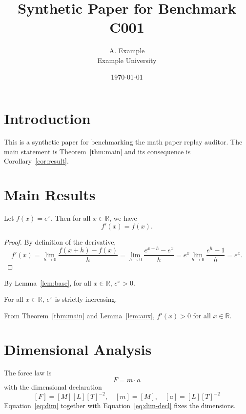 \documentclass{article}
\title{Synthetic Paper for Benchmark C001}
\author{A. Example \\ Example University}
\date{\today}
\begin{document}
\maketitle

\section{Introduction}
This is a synthetic paper for benchmarking the math paper replay auditor.
The main statement is Theorem~\ref{thm:main} and its consequence is
Corollary~\ref{cor:result}.

\section{Main Results}
\begin{theorem}
\label{thm:main}
Let $f(x) = e^x$. Then for all $x \in \mathbb{R}$, we have
\begin{equation}
\label{eq:main}
f'(x) = f(x).
\end{equation}
\end{theorem}

\begin{proof}
By definition of the derivative,
\begin{equation}
\label{eq:deriv}
f'(x) = \lim_{h \to 0} \frac{f(x+h) - f(x)}{h} = \lim_{h \to 0} \frac{e^{x+h} - e^x}{h} = e^x \lim_{h \to 0} \frac{e^h - 1}{h} = e^x.
\end{equation}
\end{proof}

\begin{lemma}
\label{lem:aux}
By Lemma~\ref{lem:base}, for all $x \in \mathbb{R}$, $e^x > 0$.
\end{lemma}

\begin{lemma}
\label{lem:base}
For all $x \in \mathbb{R}$, $e^x$ is strictly increasing.
\end{lemma}

\begin{corollary}
\label{cor:result}
From Theorem~\ref{thm:main} and Lemma~\ref{lem:aux}, $f'(x) > 0$ for all $x \in \mathbb{R}$.
\end{corollary}

\section{Dimensional Analysis}
The force law is
\begin{equation}
\label{eq:dim}
F = m \cdot a
\end{equation}
with the dimensional declaration
\begin{equation}
\label{eq:dim-decl}
[F] = [M][L][T]^{-2}, \quad [m] = [M], \quad [a] = [L][T]^{-2}
\end{equation}
Equation~\ref{eq:dim} together with Equation~\ref{eq:dim-decl} fixes the dimensions.
\end{document}
